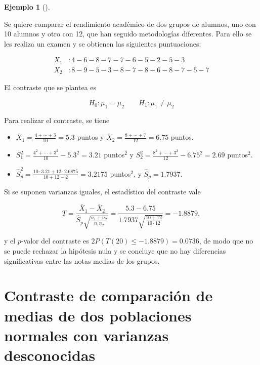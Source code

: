 \documentclass[
  spanish,
  a4paper,
]{scrreport}
\providecommand{\tightlist}{%
  \setlength{\itemsep}{0pt}\setlength{\parskip}{0pt}}
\theoremstyle{plain}
\theoremstyle{definition}
\newtheorem{example}{Ejemplo}[chapter]
\theoremstyle{definition}
\theoremstyle{remark}
\begin{document}
\begin{example}[]\protect\hypertarget{exm-contraste-diferencia-medias-normales-varianzas-desconocidas-iguales}{}\label{exm-contraste-diferencia-medias-normales-varianzas-desconocidas-iguales}

Se quiere comparar el rendimiento académico de dos grupos de alumnos,
uno con 10 alumnos y otro con 12, que han seguido metodologías
diferentes. Para ello se les realiza un examen y se obtienen las
siguientes puntuaciones:

\begin{align*}
X_1 &: 4 - 6 - 8 - 7 - 7 - 6 - 5 - 2 - 5 - 3  \\
X_2 &: 8 - 9 - 5 - 3 - 8 - 7 - 8 - 6 - 8 - 7 - 5 - 7
\end{align*}

El contraste que se plantea es

\[
H_0: \mu_1=\mu_2\qquad H_1: \mu_1\neq \mu_2
\]

Para realizar el contraste, se tiene

\begin{itemize}
\tightlist
\item
  \(\bar{X}_1 = \frac{4+\cdots +3}{10}=5.3\) puntos y
  \(\bar{X}_2=\frac{8+\cdots +7}{12}=6.75\) puntos.
\item
  \(S_1^2= \frac{4^2+\cdots + 3^2}{10}-5.3^2=3.21\) puntos\(^2\) y
  \(S_2^2= \frac{8^2+\cdots +3^2}{12}-6.75^2=2.69\) puntos\(^2\).
\item
  \(\hat{S}_p^2 = \frac{10\cdot 3.21+12\cdot 2.6875}{10+12-2}= 3.2175\)
  puntos\(^2\), y \(\hat S_p=1.7937\).
\end{itemize}

Si se suponen varianzas iguales, el estadístico del contraste vale

\[
T=\frac{\bar{X}_1-\bar{X}_2}{\hat{S}_p\sqrt{\frac{n_1+n_2}{n_1n_2}}} = \frac{5.3-6.75}{1.7937\sqrt{\frac{10+12}{10\cdot 12}}} = -1.8879,
\]

y el \(p\)-valor del contraste es \(2P(T(20)\leq -1.8879) = 0.0736\), de
modo que no se puede rechazar la hipótesis nula y se concluye que no hay
diferencias significativas entre las notas medias de los grupos.

\end{example}

\section{Contraste de comparación de medias de dos poblaciones normales
con varianzas
desconocidas}\label{contraste-de-comparaciuxf3n-de-medias-de-dos-poblaciones-normales-con-varianzas-desconocidas}
\end{document}
